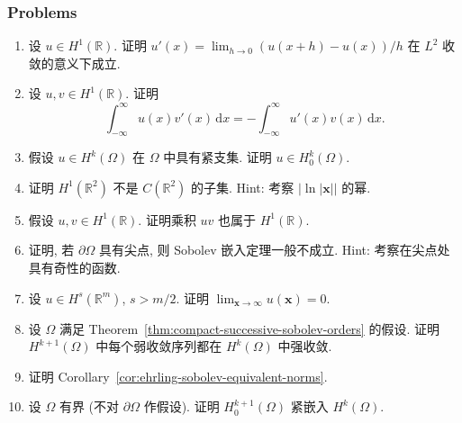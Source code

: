 \subsubsection{Problems}\label{subsec:sobolev-problems}

\begin{enumerate}[label=\thesection.\arabic*.,ref=\thesection.\arabic*,start=1,series=book-problems]

\item\label{ex:sobolev-difference-quotient-l-two-convergence} 设 $u\in H^1(\mathbb{R})$. 证明 $u'(x)=\lim_{h\to0}(u(x+h)-u(x))/h$ 在 $L^2$ 收敛的意义下成立.

\item\label{ex:sobolev-line-integration-by-parts} 设 $u,v\in H^1(\mathbb{R})$. 证明\[\int_{-\infty}^{\infty}u(x)v'(x)\,\mathrm{d}x=-\int_{-\infty}^{\infty}u'(x)v(x)\,\mathrm{d}x.\]

\item\label{ex:compact-support-zero-boundary-sobolev} 假设 $u\in H^k(\Omega)$ 在 $\Omega$ 中具有紧支集. 证明 $u\in H_0^k(\Omega)$.

\item\label{ex:sobolev-embedding-critical-counterexample} 证明 $H^1(\mathbb{R}^2)$ 不是 $C(\mathbb{R}^2)$ 的子集. Hint: 考察 $|\ln|\bm{x}||$ 的幂.

\item\label{ex:one-dimensional-h-one-product} 假设 $u,v\in H^1(\mathbb{R})$. 证明乘积 $uv$ 也属于 $H^1(\mathbb{R})$.

\item\label{ex:sobolev-embedding-cusp-failure} 证明, 若 $\partial\Omega$ 具有尖点, 则 Sobolev 嵌入定理一般不成立. Hint: 考察在尖点处具有奇性的函数.

\item\label{ex:sobolev-continuous-functions-vanish-at-infinity} 设 $u\in H^s(\mathbb{R}^m)$, $s>m/2$. 证明 $\lim_{\bm{x}\to\infty}u(\bm{x})=0$.

\item\label{ex:weak-sobolev-convergence-lower-order-strong} 设 $\Omega$ 满足 Theorem~\ref{thm:compact-successive-sobolev-orders} 的假设. 证明 $H^{k+1}(\Omega)$ 中每个弱收敛序列都在 $H^k(\Omega)$ 中强收敛.

\item\label{ex:ehrling-sobolev-equivalent-norms} 证明 Corollary~\ref{cor:ehrling-sobolev-equivalent-norms}.

\item\label{ex:zero-boundary-compact-sobolev-embedding-no-regularity} 设 $\Omega$ 有界 (不对 $\partial\Omega$ 作假设). 证明 $H_0^{k+1}(\Omega)$ 紧嵌入 $H^k(\Omega)$.


\end{enumerate}
